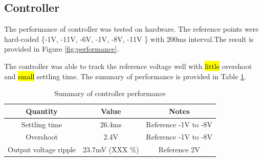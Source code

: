 \subsection{Controller}
The performance of controller was tested on hardware. The reference points were hard-coded \{-1V, -11V, -6V, -1V, -8V, -11V \} with 200ms interval.The result is provided in Figure \ref{fig:performance}.

The controller was able to track the reference voltage well with \hl{little} overshoot and \hl{small} settling time. The summary of performance is provided in Table \ref{tab:performance}.

\begin{table}[h]
\centering
\begin{tabular}{|c|c|c|}
    \hline
    Quantity        & Value  & Notes \\ \hline \hline 
    Settling time   & 26.4ms &  Reference -1V to -8V\\ \hline
    Overshoot       & 2.4V   &  Reference -1V to -8V\\ \hline
    Output voltage ripple & 23.7mV (XXX \%) & Reference 2V\\
    \hline
\end{tabular}
\caption{Summary of controller performance}
\label{tab:performance}
\end{table}

